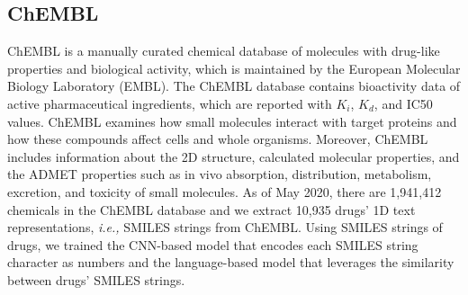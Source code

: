 \subsection{ChEMBL}
ChEMBL \cite{davies2015chembl, gaulton2017chembl} is a manually curated chemical database of molecules with drug-like properties and biological activity, which is maintained by the European Molecular Biology Laboratory (EMBL). The ChEMBL database contains bioactivity data of active pharmaceutical ingredients, which are reported with $K_i$, $K_d$, and IC50 values. ChEMBL examines how small molecules interact with target proteins and how these compounds affect cells and whole organisms. Moreover, ChEMBL includes information about the 2D structure, calculated molecular properties, and the ADMET properties such as in vivo absorption, distribution, metabolism, excretion, and toxicity of small molecules. As of May 2020, there are 1,941,412 chemicals in the ChEMBL database and we extract 10,935 drugs' 1D text representations, \textit{i.e.,} SMILES strings from ChEMBL. Using SMILES strings of drugs, we trained the CNN-based model that encodes each SMILES string character as numbers and the language-based model that leverages the similarity between drugs' SMILES strings.